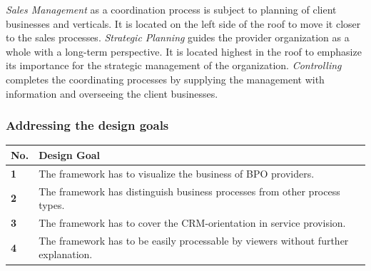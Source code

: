 	  \textit{Sales Management} as a coordination process is subject to planning of client businesses and verticals. It is located on the left side of the roof to move it closer to the sales processes. \textit{Strategic Planning} guides the provider organization as a whole with a long-term perspective. It is located highest in the roof to emphasize its importance for the strategic management of the organization. \textit{Controlling} completes the coordinating processes by supplying the management with information and overseeing the client businesses. 
	 	 
	 \subsubsection{Addressing  the design goals}
	 
	 	 	\begin{table}[caption={Design Goals}, label={tab:desobj}]
	 	\centering
	 	\begin{tabular}{l p{13.3cm}}
	 		
	 		\textbf{No. }&\textbf{ Design Goal}
	 		\\ \hline
	 		\textbf{1 }                        & The framework has to visualize the business of BPO providers.                                     \\ \hline
	 		\textbf{2}                         & The framework has distinguish business processes from other process types.                                                                                                                   \\ \hline
	 		\textbf{3 }                        & The framework has to cover the CRM-orientation in service provision. \\ \hline
	 		\textbf{4}                         & The framework has to be easily processable by viewers without further explanation.                                                              
	 		
	 	\end{tabular}
	 \end{table}
 

